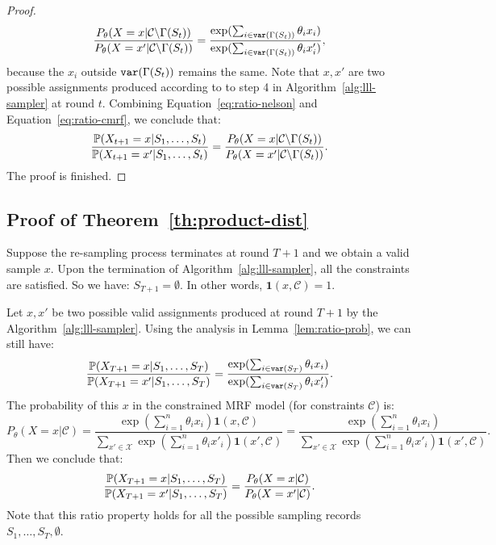 \begin{lemma}
\begin{proof}
\begin{equation}
\begin{aligned}
\frac{P_{\theta}(X=x|\mathcal{C}\backslash \Gamma(S_t))}{P_{\theta}(X=x'|\mathcal{C}\backslash\Gamma(S_t))}=\frac{\exp(\sum_{i\in \mathtt{var}(\Gamma(S_t))}\theta_ix_i)}{\exp(\sum_{i\in \mathtt{var}(\Gamma(S_t))}\theta_ix'_i)},
\end{aligned}
\end{equation}
because the $x_i$ outside $\mathtt{var}(\Gamma(S_t))$ remains the same. Note that $x,x'$ are two possible assignments produced according to to step 4 in Algorithm~\ref{alg:lll-sampler} at round $t$. 
Combining Equation~\eqref{eq:ratio-nelson} and Equation~\eqref{eq:ratio-cmrf}, we conclude that:
\begin{equation*}
\begin{aligned}
\frac{\mathbb{P}(X_{t+1}=x|S_1,\ldots,S_t)}{\mathbb{P}(X_{t+1}=x'|S_1,\ldots,S_t)}=\frac{P_{\theta}(X=x|\mathcal{C}\backslash \Gamma(S_t))}{P_{\theta}(X=x'|\mathcal{C}\backslash\Gamma(S_t))}.
\end{aligned}
\end{equation*}
The proof is finished. 
\end{proof}
\end{lemma}

\subsection{Proof of Theorem~\ref{th:product-dist}}
Suppose the re-sampling process terminates at round $T+1$ and we obtain a valid sample $x$. Upon the termination of Algorithm~\ref{alg:lll-sampler}, all the constraints are satisfied. So we have: $S_{T+1}=\emptyset$. In other words, $\mathbf{1}(x,\mathcal{C})=1$. 

Let $x,x'$ be two possible valid assignments produced at round $T+1$ by the Algorithm~\ref{alg:lll-sampler}. Using the analysis in Lemma~\ref{lem:ratio-prob}, we can still have:
\begin{equation*}
\frac{\mathbb{P}(X_{T+1}=x|S_1,\ldots, S_T)}{\mathbb{P}(X_{T+1}=x'|S_1,\ldots, S_T)}=\frac{\exp(\sum_{i\in\mathtt{var}(S_T)}\theta_ix_i)}{\exp(\sum_{i\in\mathtt{var}(S_T)}\theta_ix'_i)}.
\end{equation*}
The probability of this $x$ in the constrained MRF model  (for constraints  $\mathcal{C}$) is:
\begin{equation*}
P_{\theta}(X=x|\mathcal{C})=\frac{\exp(\sum_{i=1}^n\theta_i x_i)\mathbf{1}(x,\mathcal{C})}{\sum_{x'\in\mathcal{X}}  \exp(\sum_{i=1}^n\theta_i x'_i)\mathbf{1}\left(x',\mathcal{C}\right)}
=\frac{\exp(\sum_{i=1}^n\theta_i x_i)}{\sum_{x'\in\mathcal{X}}  \exp(\sum_{i=1}^n\theta_i x'_i)\mathbf{1}\left(x',\mathcal{C}\right)}.
\end{equation*}
Then we conclude that:
\begin{equation*}
\frac{\mathbb{P}(X_{T+1}=x|S_1,\ldots, S_T)}{\mathbb{P}(X_{T+1}=x'|S_1,\ldots, S_T)}=\frac{P_{\theta}(X=x|\mathcal{C})}{P_{\theta}(X=x'|\mathcal{C})}.
\end{equation*}
Note that this ratio property holds for all the possible sampling records $S_1,\ldots, S_T,\emptyset$.


